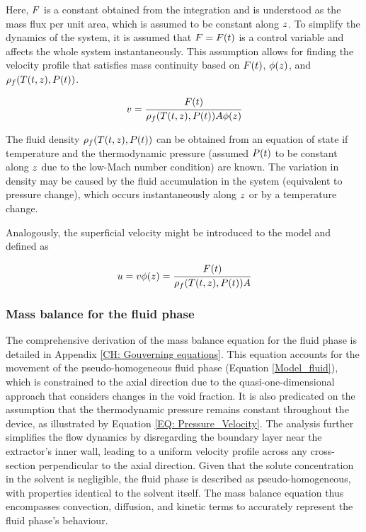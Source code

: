 \documentclass[../Article_Model_Parameters.tex]{subfiles}
\begin{document}
	Here, ${\color{black}F}$ is a constant obtained from the integration and is understood as the mass flux per unit area, which is assumed to be constant along ${\color{black}z}$. To simplify the dynamics of the system, it is assumed that ${\color{black}F}={\color{black}F}(t)$ is a control variable and affects the whole system instantaneously. This assumption allows for finding the velocity profile that satisfies mass continuity based on ${\color{black}F}(t)$, ${\color{black}\phi}(z)$, and ${\color{black}\rho_f}({\color{black}T}(t,z),{\color{black}P}(t))$.
	
	{\footnotesize
	\begin{equation}
		v = \cfrac{{\color{black}F}(t)}{{\color{black}\rho_f}({\color{black}T}(t,z),{\color{black}P}(t)) {\color{black}A\phi}(z)} 
	\end{equation}
	}
	
	The fluid density ${\color{black}\rho_f}({\color{black}T}(t,z),{\color{black}P}(t))$ can be obtained from an equation of state if temperature and the thermodynamic pressure (assumed ${\color{black}P}(t)$ to be constant along ${\color{black}z}$ due to the low-Mach number condition) are known. The variation in density may be caused by the fluid accumulation in the system (equivalent to pressure change), which occurs instantaneously along ${\color{black}z}$ or by a temperature change. 
	
	Analogously, the superficial velocity might be introduced to the model and defined as
	
	{\footnotesize
		\begin{equation}
			u = v {\color{black}\phi}(z) = \cfrac{{\color{black}F}(t)}{{\color{black}\rho_f}({\color{black}T}(t,z),{\color{black}P}(t)) {\color{black} A} }
		\end{equation}
	}
	
	\subsubsection{Mass balance for the fluid phase} \label{CH: Mass_balance_fluid}
	
	The comprehensive derivation of the mass balance equation for the fluid phase is detailed in Appendix \ref{CH: Gouverning equations}. This equation accounts for the movement of the pseudo-homogeneous fluid phase (Equation \ref{Model_fluid}), which is constrained to the axial direction due to the quasi-one-dimensional approach that considers changes in the void fraction. It is also predicated on the assumption that the thermodynamic pressure remains constant throughout the device, as illustrated by Equation \ref{EQ: Pressure_Velocity}. The analysis further simplifies the flow dynamics by disregarding the boundary layer near the extractor's inner wall, leading to a uniform velocity profile across any cross-section perpendicular to the axial direction. Given that the solute concentration in the solvent is negligible, the fluid phase is described as pseudo-homogeneous, with properties identical to the solvent itself. The mass balance equation thus encompasses convection, diffusion, and kinetic terms to accurately represent the fluid phase's behaviour.
	
\end{document}
